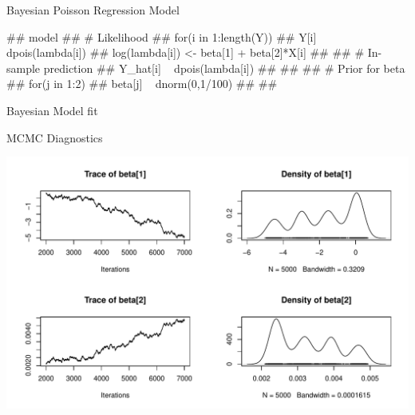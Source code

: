 \documentclass[11pt,ignorenonframetext,]{beamer}
\newenvironment{Shaded}{}{}
\newcommand{\KeywordTok}[1]{\textcolor[rgb]{0.00,0.44,0.13}{\textbf{{#1}}}}
\newcommand{\DataTypeTok}[1]{\textcolor[rgb]{0.56,0.13,0.00}{{#1}}}
\newcommand{\DecValTok}[1]{\textcolor[rgb]{0.25,0.63,0.44}{{#1}}}
\newcommand{\StringTok}[1]{\textcolor[rgb]{0.25,0.44,0.63}{{#1}}}
\newcommand{\OtherTok}[1]{\textcolor[rgb]{0.00,0.44,0.13}{{#1}}}
\newcommand{\NormalTok}[1]{{#1}}
\let\oldShaded\Shaded
\let\endoldShaded\endShaded
\renewenvironment{Shaded}{\footnotesize\begin{spacing}{0.9}\oldShaded}{\endoldShaded\end{spacing}}
\let\oldverbatim\verbatim
\let\endoldverbatim\endverbatim
\renewenvironment{verbatim}{\footnotesize\begin{spacing}{0.9}\oldverbatim}{\endoldverbatim\end{spacing}}
\begin{document}
\begin{frame}[fragile]{Bayesian Poisson Regression Model}

\begin{verbatim}
## model{
##   # Likelihood
##   for(i in 1:length(Y)){
##     Y[i] ~ dpois(lambda[i])
##     log(lambda[i]) <- beta[1] + beta[2]*X[i]
##     
##     # In-sample prediction
##     Y_hat[i] ~ dpois(lambda[i])
##   }
## 
##   # Prior for beta
##   for(j in 1:2){
##     beta[j] ~ dnorm(0,1/100)
##   }
## }
\end{verbatim}

\end{frame}

\begin{frame}[fragile]{Bayesian Model fit}

\begin{Shaded}
\end{Shaded}

\end{frame}

\begin{frame}{MCMC Diagnostics}

\includegraphics{Lec3_files/figure-beamer/unnamed-chunk-18-1.pdf}

\end{frame}
\end{document}
